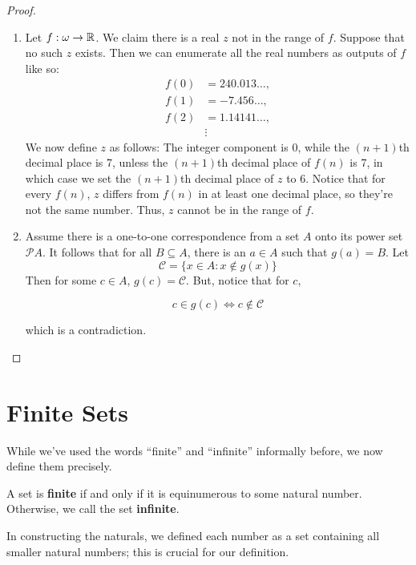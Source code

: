 \begin{proof}
    \begin{enumerate}[label=(\roman*)]
        \item Let $f: \omega \to \mathbb{R}$. We claim there is a real $z$ not in the range of $f$. Suppose that no such $z$ exists. Then we can enumerate all the real numbers as outputs of $f$ like so: 
        \begin{align*}
            f(0) & = 240.013\ldots, \\
            f(1) & = -7.456\ldots, \\
            f(2) & = 1.14141\ldots, \\
            & \vdots 
        \end{align*}
        We now define $z$ as follows: The integer component is 0, while the $(n+1)$th decimal place is 7, unless the $(n+1)$th decimal place of $f(n)$ is 7, in which case we set the $(n+1)$th decimal place of $z$ to 6. Notice that for every $f(n)$, $z$ differs from $f(n)$ in at least one decimal place, so they're not the same number. Thus, $z$ cannot be in the range of $f$. 

        \item Assume there is a one-to-one correspondence from a set $A$ onto its power set $\mathcal{P}A$. It follows that for all $B \subseteq A$, there is an $a \in A$ such that $g(a) = B$. Let 
        \[\mathcal{C} = \{x \in A : x \notin g(x)\}\]
        Then for some $c \in A$, $g(c) = \mathcal{C}$. But, notice that for $c$, 

        \[c \in g(c) \iff c \notin \mathcal{C}\]

        which is a contradiction. 
    \end{enumerate}
\end{proof}

\section{Finite Sets}

While we've used the words ``finite'' and ``infinite'' informally before, we now define them precisely.

\begin{definition}
    A set is \textbf{finite} if and only if it is equinumerous to some natural number. Otherwise, we call the set \textbf{infinite}.
\end{definition}

In constructing the naturals, we defined each number as a set containing all smaller natural numbers; this is crucial for our definition. 

